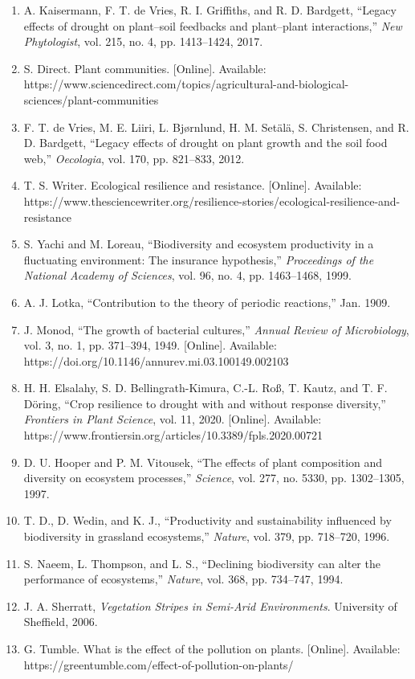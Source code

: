 \documentclass[11pt,a4paper]{ctexart}
\begin{document}
\begin{enumerate}
\item[{[1]}] A. Kaisermann, F. T. de Vries, R. I. Griffiths, and R. D. Bardgett, ``Legacy effects of drought on plant--soil feedbacks and plant--plant interactions,'' \emph{New Phytologist}, vol. 215, no. 4, pp. 1413--1424, 2017.
\item[{[2]}] S. Direct. Plant communities. [Online]. Available: https://www.sciencedirect.com/topics/agricultural-and-biological-sciences/plant-communities
\item[{[3]}] F. T. de Vries, M. E. Liiri, L. Bj\o rnlund, H. M. Set\"al\"a, S. Christensen, and R. D. Bardgett, ``Legacy effects of drought on plant growth and the soil food web,'' \emph{Oecologia}, vol. 170, pp. 821--833, 2012.
\item[{[4]}] T. S. Writer. Ecological resilience and resistance. [Online]. Available: https://www.thesciencewriter.org/resilience-stories/ecological-resilience-and-resistance
\item[{[5]}] S. Yachi and M. Loreau, ``Biodiversity and ecosystem productivity in a fluctuating environment: The insurance hypothesis,'' \emph{Proceedings of the National Academy of Sciences}, vol. 96, no. 4, pp. 1463--1468, 1999.
\item[{[6]}] A. J. Lotka, ``Contribution to the theory of periodic reactions,'' Jan. 1909.
\item[{[7]}] J. Monod, ``The growth of bacterial cultures,'' \emph{Annual Review of Microbiology}, vol. 3, no. 1, pp. 371--394, 1949. [Online]. Available: https://doi.org/10.1146/annurev.mi.03.100149.002103
\item[{[8]}] H. H. Elsalahy, S. D. Bellingrath-Kimura, C.-L. Ro\ss, T. Kautz, and T. F. D\"oring, ``Crop resilience to drought with and without response diversity,'' \emph{Frontiers in Plant Science}, vol. 11, 2020. [Online]. Available: https://www.frontiersin.org/articles/10.3389/fpls.2020.00721
\item[{[9]}] D. U. Hooper and P. M. Vitousek, ``The effects of plant composition and diversity on ecosystem processes,'' \emph{Science}, vol. 277, no. 5330, pp. 1302--1305, 1997.
\item[{[10]}] T. D., D. Wedin, and K. J., ``Productivity and sustainability influenced by biodiversity in grassland ecosystems,'' \emph{Nature}, vol. 379, pp. 718--720, 1996.
\item[{[11]}] S. Naeem, L. Thompson, and L. S., ``Declining biodiversity can alter the performance of ecosystems,'' \emph{Nature}, vol. 368, pp. 734--747, 1994.
\item[{[12]}] J. A. Sherratt, \emph{Vegetation Stripes in Semi-Arid Environments}. University of Sheffield, 2006.
\item[{[13]}] G. Tumble. What is the effect of the pollution on plants. [Online]. Available: https://greentumble.com/effect-of-pollution-on-plants/
\end{enumerate}
\end{document}
